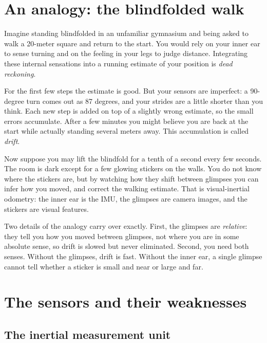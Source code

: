 \section{An analogy: the blindfolded walk}

Imagine standing blindfolded in an unfamiliar gymnasium and being asked to walk a 20-meter square
and return to the start. You would rely on your inner ear to sense turning and on the feeling in
your legs to judge distance. Integrating these internal sensations into a running estimate of your
position is \emph{dead reckoning}.

For the first few steps the estimate is good. But your sensors are imperfect: a 90-degree turn
comes out as 87 degrees, and your strides are a little shorter than you think. Each new step is
added on top of a slightly wrong estimate, so the small errors accumulate. After a few minutes you
might believe you are back at the start while actually standing several meters away. This
accumulation is called \emph{drift}.

Now suppose you may lift the blindfold for a tenth of a second every few seconds. The room is dark
except for a few glowing stickers on the walls. You do not know where the stickers are, but by
watching how they shift between glimpses you can infer how you moved, and correct the walking
estimate. That is visual-inertial odometry: the inner ear is the IMU, the glimpses are camera
images, and the stickers are visual features.

Two details of the analogy carry over exactly. First, the glimpses are \emph{relative}: they tell
you how you moved between glimpses, not where you are in some absolute sense, so drift is slowed
but never eliminated. Second, you need both senses. Without the glimpses, drift is fast. Without
the inner ear, a single glimpse cannot tell whether a sticker is small and near or large and far.

\section{The sensors and their weaknesses}

\subsection{The inertial measurement unit}

